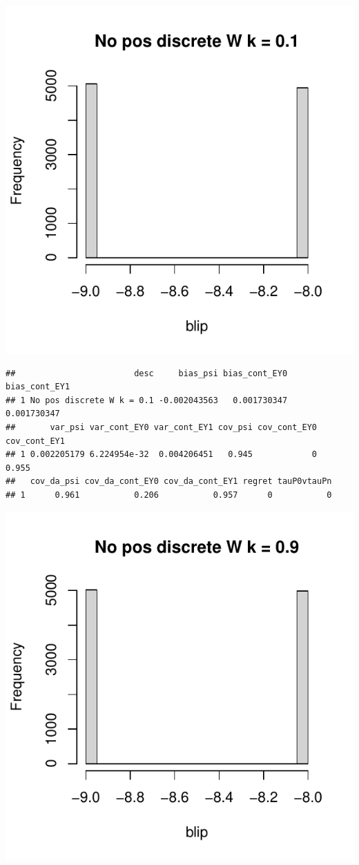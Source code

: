 \documentclass[11pt]{article}\usepackage[]{graphicx}\usepackage[table]{xcolor}
\makeatletter
\def\maxwidth{ %
  \ifdim\Gin@nat@width>\linewidth
    \linewidth
  \else
    \Gin@nat@width
  \fi
}
\newenvironment{kframe}{%
 \def\at@end@of@kframe{}%
 \ifinner\ifhmode%
  \def\at@end@of@kframe{\end{minipage}}%
  \begin{minipage}{\columnwidth}%
 \fi\fi%
 \def\FrameCommand##1{\hskip\@totalleftmargin \hskip-\fboxsep
 \colorbox{shadecolor}{##1}\hskip-\fboxsep
     \hskip-\linewidth \hskip-\@totalleftmargin \hskip\columnwidth}%
 \MakeFramed {\advance\hsize-\width
   \@totalleftmargin\z@ \linewidth\hsize
   \@setminipage}}%
 {\par\unskip\endMakeFramed%
 \at@end@of@kframe}
\newenvironment{knitrout}{}{} %
\makeatother
\begin{document}
\begin{knitrout}
\includegraphics[width=\maxwidth]{figure/unnamed-chunk-4-5} 
\begin{kframe}\begin{verbatim}
##                        desc     bias_psi bias_cont_EY0 bias_cont_EY1
## 1 No pos discrete W k = 0.1 -0.002043563   0.001730347   0.001730347
##       var_psi var_cont_EY0 var_cont_EY1 cov_psi cov_cont_EY0 cov_cont_EY1
## 1 0.002205179 6.224954e-32  0.004206451   0.945            0        0.955
##   cov_da_psi cov_da_cont_EY0 cov_da_cont_EY1 regret tauP0vtauPn
## 1      0.961           0.206           0.957      0           0
\end{verbatim}
\end{kframe}
\includegraphics[width=\maxwidth]{figure/unnamed-chunk-4-6} 

\end{knitrout}
\end{document}
